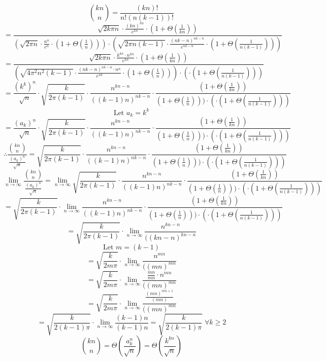 \documentclass{article}
\begin{document}
$$\binom{kn}{n} = \frac{(kn)!}{n!(n(k-1))!}$$
$$= \frac{\sqrt{2k\pi n} \cdot \frac{(kn)^{kn}}{e^{kn}} \cdot (1 + \Theta(\frac{1}{kn}))}{(\sqrt{2\pi n} \cdot \frac{n^n}{e^n} \cdot (1 + \Theta(\frac{1}{n}))) \cdot (\sqrt{2\pi n(k-1)} \cdot \frac{(nk-n)^{nk-n}}{e^{nk-n}} \cdot (1 + \Theta(\frac{1}{n(k-1)})))}$$
$$= \frac{\sqrt{2k\pi n} \cdot \frac{k^{kn} \cdot n^{kn}}{e^{kn}} \cdot (1 + \Theta(\frac{1}{kn}))}  {(\sqrt{4\pi^2 n^2 (k-1)} \cdot \frac{(nk-n)^{nk-n} \cdot n^n}{e^{nk}} \cdot (1 + \Theta(\frac{1}{n}))) \cdot ( \cdot (1 + \Theta(\frac{1}{n(k-1)})))}$$
$$=\frac{(k^k)^n}{\sqrt{n}} \cdot \sqrt{\frac{k}{2\pi(k-1)}} \cdot \frac{n^{kn - n}}{((k-1)n)^{nk-n}}  \cdot \frac{ (1 + \Theta(\frac{1}{kn}))}{(1 + \Theta(\frac{1}{n}))) \cdot ( \cdot (1 + \Theta(\frac{1}{n(k-1)})))}$$
$$\text{Let } a_{k} = k^k$$
$$=\frac{(a_k)^n}{\sqrt{n}} \cdot \sqrt{\frac{k}{2\pi(k-1)}} \cdot \frac{n^{kn - n}}{((k-1)n)^{nk-n}}  \cdot \frac{ (1 + \Theta(\frac{1}{kn}))}{(1 + \Theta(\frac{1}{n}))) \cdot ( \cdot (1 + \Theta(\frac{1}{n(k-1)})))}$$
$$\therefore \frac{\binom{kn}{n}}{\frac{(a_k)^n}{\sqrt{n}}} = \sqrt{\frac{k}{2\pi(k-1)}} \cdot \frac{n^{kn - n}}{((k-1)n)^{nk-n}}  \cdot \frac{ (1 + \Theta(\frac{1}{kn}))}{(1 + \Theta(\frac{1}{n}))) \cdot ( \cdot (1 + \Theta(\frac{1}{n(k-1)})))}$$
$$\lim_{n \rightarrow \infty} \frac{\binom{kn}{n}}{\frac{(a_k)^n}{\sqrt{n}}} = \lim_{n \rightarrow \infty} \sqrt{\frac{k}{2\pi(k-1)}} \cdot \frac{n^{kn - n}}{((k-1)n)^{nk-n}}  \cdot \frac{ (1 + \Theta(\frac{1}{kn}))}{(1 + \Theta(\frac{1}{n}))) \cdot ( \cdot (1 + \Theta(\frac{1}{n(k-1)})))}$$
$$=\sqrt{\frac{k}{2\pi(k-1)}} \cdot \lim_{n \rightarrow \infty}  \frac{n^{kn - n}}{((k-1)n)^{nk-n}}  \cdot \frac{ (1 + \Theta(\frac{1}{kn}))}{(1 + \Theta(\frac{1}{n}))) \cdot ( \cdot (1 + \Theta(\frac{1}{n(k-1)})))}$$
$$=\sqrt{\frac{k}{2\pi(k-1)}} \cdot \lim_{n \rightarrow \infty}  \frac{n^{kn - n}}{((kn-n)^{kn-n}} $$
$$\text{Let } m = (k-1)$$
$$=\sqrt{\frac{k}{2m\pi}} \cdot \lim_{n \rightarrow \infty}  \frac{n^{mn}}{((mn)^{mn}} $$
$$=\sqrt{\frac{k}{2m\pi}} \cdot \lim_{n \rightarrow \infty}  \frac{\frac{mn}{mn} \cdot n^{mn}}{((mn)^{mn}} $$
$$=\sqrt{\frac{k}{2m\pi}} \cdot \lim_{n \rightarrow \infty}  \frac{\frac{(mn)^{mn+1}}{(mn)}}{((mn)^{mn}} $$
$$=\sqrt{\frac{k}{2(k-1)\pi}} \cdot \lim_{n \rightarrow \infty}  \frac{(k-1)n}{(k-1)n} = \sqrt{\frac{k}{2(k-1)\pi}} \; \forall k \ge 2$$
$$\binom{kn}{n} = \Theta(\frac{a_{k}^{n}}{\sqrt{n}}) = \Theta(\frac{k^{kn}}{\sqrt{n}})$$

\iftrue
    
%
%
%
%

%
%
%
%
\end{document}
